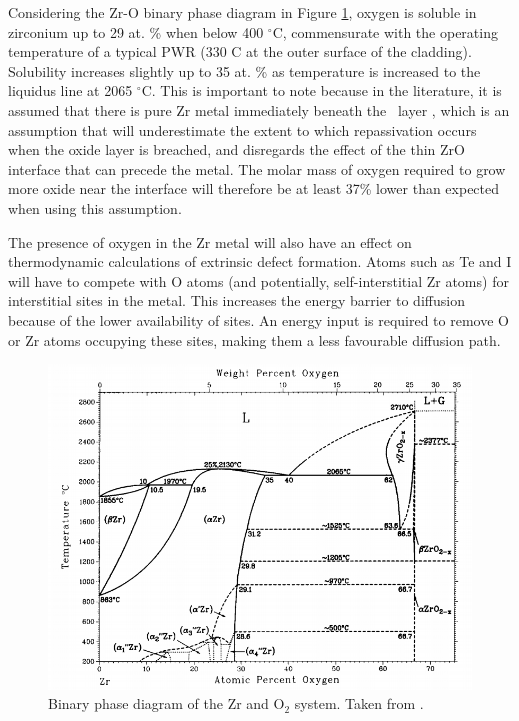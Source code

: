 Considering the Zr-O binary phase diagram in Figure \ref{figure:binary_phase_diagram}, oxygen is soluble in zirconium up to 29 at. \% when below 400 $^{\circ}$C, commensurate with the operating temperature of a typical PWR (330 \textdegree C at the outer surface of the cladding). Solubility increases slightly up to 35 at. \% as temperature is increased to the liquidus line at 2065 $^{\circ}$C. This is important to note because in the literature, it is assumed that there is pure Zr metal immediately beneath the \zirconia\ layer \cite{rossi2015first}, which is an assumption that will underestimate the extent to which repassivation occurs when the oxide layer is breached, and disregards the effect of the thin ZrO interface that can precede the metal. The molar mass of oxygen required to grow more oxide near the interface will therefore be at least 37\% lower than expected when using this assumption.

The presence of oxygen in the Zr metal will also have an effect on thermodynamic calculations of extrinsic defect formation. Atoms such as Te and I will have to compete with O atoms (and potentially, self-interstitial Zr atoms) for interstitial sites in the metal. This increases the energy barrier to diffusion because of the lower availability of sites. An energy input is required to remove O or Zr atoms occupying these sites, making them a less favourable diffusion path.


\begin{figure}[ht]
\centering
\includegraphics[width=14cm]{images/zro2_binary_phase.png}
\caption[Binary phase diagram of the Zr and O$_{2}$ system.]{Binary phase diagram of the Zr and O$_{2}$ system. Taken from \cite{Abriata1986}.}
\label{figure:binary_phase_diagram}
\end{figure}

